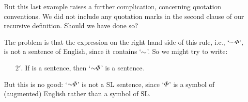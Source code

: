 \iffalse
        \newglossaryentry{metavariables}
{
name=metavariables,
description={A variable in the metalanguage that can represent any sentence in the object language}
}
\fi

But this last example raises a further complication, concerning quotation conventions. We did not include any quotation marks in the second clause of our recursive definition. Should we have done so?

The problem is that the expression on the right-hand-side of this rule, i.e., `$\enot\metaA{}$', is not a sentence of English, since it contains `$\enot$'. So we might try to write:
	\begin{enumerate}
		\item[2$'$.] If \metaA{} is a sentence, then `$\enot \metaA{}$' is a sentence.
	\end{enumerate}
But this is no good: `$\enot \metaA{}$' is not a SL sentence, since `$\varPhi{}$' is a symbol of (augmented) English rather than a symbol of SL.

